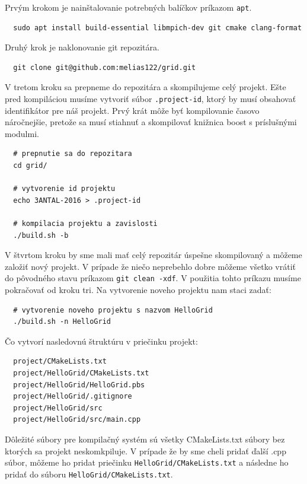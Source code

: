Prvým krokom je nainštalovanie potrebných balíčkov príkazom \texttt{apt}.
\begin{lstlisting}
  sudo apt install build-essential libmpich-dev git cmake clang-format
\end{lstlisting}
Druhý krok je naklonovanie git repozitára.
\begin{lstlisting}
  git clone git@github.com:melias122/grid.git
\end{lstlisting}
V tretom kroku sa prepneme do repozitára a skompilujeme celý projekt.
Ešte pred kompiláciou musíme vytvoriť súbor \texttt{.project-id}, ktorý by musí obsahovať
identifikátor pre náš projekt.
Prvý krát môže byť kompilovanie časovo náročnejšie,
pretože sa musí stiahnuť a skompilovať knižnica boost s príslušnými modulmi. 
\begin{lstlisting}
  # prepnutie sa do repozitara
  cd grid/

  # vytvorenie id projektu
  echo 3ANTAL-2016 > .project-id

  # kompilacia projektu a zavislosti
  ./build.sh -b
\end{lstlisting}
V štvrtom kroku by sme mali mať celý repozitár úspešne skompilovaný a môžeme založiť nový projekt.
V prípade že niečo neprebehlo dobre môžeme všetko vrátiť do pôvodného stavu príkazom \texttt{git clean -xdf}.
V použitia tohto príkazu musíme pokračovať od kroku tri.
Na vytvorenie noveho projektu nam staci zadať:
\begin{lstlisting}
  # vytvorenie noveho projektu s nazvom HelloGrid
  ./build.sh -n HelloGrid
\end{lstlisting}
Čo vytvorí nasledovnú štruktúru v priečinku projekt:
\begin{lstlisting}
  project/CMakeLists.txt
  project/HelloGrid/CMakeLists.txt
  project/HelloGrid/HelloGrid.pbs
  project/HelloGrid/.gitignore
  project/HelloGrid/src
  project/HelloGrid/src/main.cpp
\end{lstlisting}
Dôležité súbory pre kompilačný systém sú všetky CMakeLists.txt súbory bez ktorých sa projekt neskomkpiluje.
V prípade že by sme cheli pridať ďalší .cpp súbor, môžeme ho pridat priečinku \texttt{HelloGrid/CMakeLists.txt} a následne ho pridať do
súboru \texttt{HelloGrid/CMakeLists.txt}.

